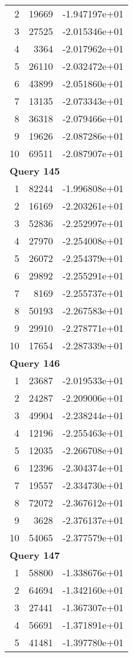 \begin{longtable}[{p}]{@{}rrp{}@{}}
2 & 19669 & -1.947197e+01 \\
3 & 27525 & -2.015346e+01 \\
4 & 3364 & -2.017962e+01 \\
5 & 26110 & -2.032472e+01 \\
6 & 43899 & -2.051860e+01 \\
7 & 13135 & -2.073343e+01 \\
8 & 36318 & -2.079466e+01 \\
9 & 19626 & -2.087286e+01 \\
10 & 69511 & -2.087907e+01 \\
\midrule
\multicolumn{3}{l}{\bfseries Query 145} \\
1 & 82244 & -1.996808e+01 \\
2 & 16169 & -2.203261e+01 \\
3 & 52836 & -2.252997e+01 \\
4 & 27970 & -2.254008e+01 \\
5 & 26072 & -2.254379e+01 \\
6 & 29892 & -2.255291e+01 \\
7 & 8169 & -2.255737e+01 \\
8 & 50193 & -2.267583e+01 \\
9 & 29910 & -2.278771e+01 \\
10 & 17654 & -2.287339e+01 \\
\midrule
\multicolumn{3}{l}{\bfseries Query 146} \\
1 & 23687 & -2.019533e+01 \\
2 & 24287 & -2.209006e+01 \\
3 & 49904 & -2.238244e+01 \\
4 & 12196 & -2.255463e+01 \\
5 & 12035 & -2.266708e+01 \\
6 & 12396 & -2.304374e+01 \\
7 & 19557 & -2.334730e+01 \\
8 & 72072 & -2.367612e+01 \\
9 & 3628 & -2.376137e+01 \\
10 & 54065 & -2.377579e+01 \\
\midrule
\multicolumn{3}{l}{\bfseries Query 147} \\
1 & 58800 & -1.338676e+01 \\
2 & 64694 & -1.342160e+01 \\
3 & 27441 & -1.367307e+01 \\
4 & 56691 & -1.371891e+01 \\
5 & 41481 & -1.397780e+01 \\

\end{longtable}
